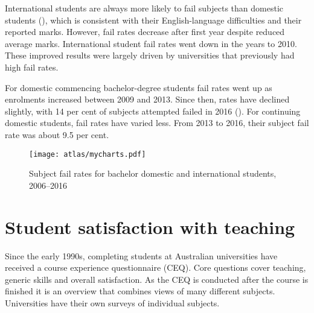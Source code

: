 \documentclass{grattan}
\begin{document}
International students are always more likely to fail subjects than domestic students (), which is consistent with their English-language difficulties and their reported marks. However, fail rates decrease after first year despite reduced average marks. International student fail rates went down in the years to 2010. These improved results were largely driven by universities that previously had high fail rates.

For domestic commencing bachelor-degree students fail rates went up as enrolments increased between 2009 and 2013. Since then, rates have declined slightly, with 14 per cent of subjects attempted failed in 2016 (). For continuing domestic students, fail rates have varied less. From 2013 to 2016, their subject fail rate was about 9.5 per cent.


    \begin{figure} %
    \caption{Subject fail rates for bachelor domestic and international students, 2006--2016}\label{fig:subject-fail-rates-for-bachelor-domestic-and-international-students-20062016}
    \texttt{[image: atlas/mycharts.pdf]}
    \end{figure}



%
\section{Student satisfaction with teaching}\label{sec:student-satisfaction-with-teaching}

Since the early 1990s, completing students at Australian universities have received a course experience questionnaire (CEQ). Core questions cover teaching, generic skills and overall satisfaction. As the CEQ is conducted after the course is finished it is an overview that combines views of many different subjects. Universities have their own surveys of individual subjects.
\end{document}
